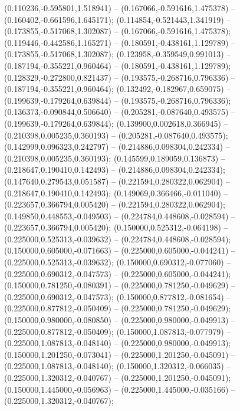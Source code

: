  (0.110236,-0.595801,1.518941) -- (0.167066,-0.591616,1.475378) -- (0.160402,-0.661596,1.645171);
 (0.114854,-0.521443,1.341919) -- (0.173855,-0.517068,1.302087) -- (0.167066,-0.591616,1.475378);
 (0.119446,-0.442586,1.165271) -- (0.180591,-0.438161,1.129789) -- (0.173855,-0.517068,1.302087);
 (0.123958,-0.359549,0.991013) -- (0.187194,-0.355221,0.960464) -- (0.180591,-0.438161,1.129789);
 (0.128329,-0.272800,0.821437) -- (0.193575,-0.268716,0.796336) -- (0.187194,-0.355221,0.960464);
 (0.132492,-0.182967,0.659075) -- (0.199639,-0.179264,0.639844) -- (0.193575,-0.268716,0.796336);
 (0.136373,-0.090844,0.506640) -- (0.205281,-0.087640,0.493575) -- (0.199639,-0.179264,0.639844);
 (0.139900,0.002618,0.366945) -- (0.210398,0.005235,0.360193) -- (0.205281,-0.087640,0.493575);
 (0.142999,0.096323,0.242797) -- (0.214886,0.098304,0.242334) -- (0.210398,0.005235,0.360193);
 (0.145599,0.189059,0.136873) -- (0.218647,0.190410,0.142493) -- (0.214886,0.098304,0.242334);
 (0.147640,0.279543,0.051587) -- (0.221594,0.280322,0.062904) -- (0.218647,0.190410,0.142493);
 (0.149069,0.366466,-0.011040) -- (0.223657,0.366794,0.005420) -- (0.221594,0.280322,0.062904);
 (0.149850,0.448553,-0.049503) -- (0.224784,0.448608,-0.028594) -- (0.223657,0.366794,0.005420);
 (0.150000,0.525312,-0.064198) -- (0.225000,0.525313,-0.039632) -- (0.224784,0.448608,-0.028594);
 (0.150000,0.605000,-0.071663) -- (0.225000,0.605000,-0.044241) -- (0.225000,0.525313,-0.039632);
 (0.150000,0.690312,-0.077060) -- (0.225000,0.690312,-0.047573) -- (0.225000,0.605000,-0.044241);
 (0.150000,0.781250,-0.080391) -- (0.225000,0.781250,-0.049629) -- (0.225000,0.690312,-0.047573);
 (0.150000,0.877812,-0.081654) -- (0.225000,0.877812,-0.050409) -- (0.225000,0.781250,-0.049629);
 (0.150000,0.980000,-0.080850) -- (0.225000,0.980000,-0.049913) -- (0.225000,0.877812,-0.050409);
 (0.150000,1.087813,-0.077979) -- (0.225000,1.087813,-0.048140) -- (0.225000,0.980000,-0.049913);
 (0.150000,1.201250,-0.073041) -- (0.225000,1.201250,-0.045091) -- (0.225000,1.087813,-0.048140);
 (0.150000,1.320312,-0.066035) -- (0.225000,1.320312,-0.040767) -- (0.225000,1.201250,-0.045091);
 (0.150000,1.445000,-0.056963) -- (0.225000,1.445000,-0.035166) -- (0.225000,1.320312,-0.040767);
